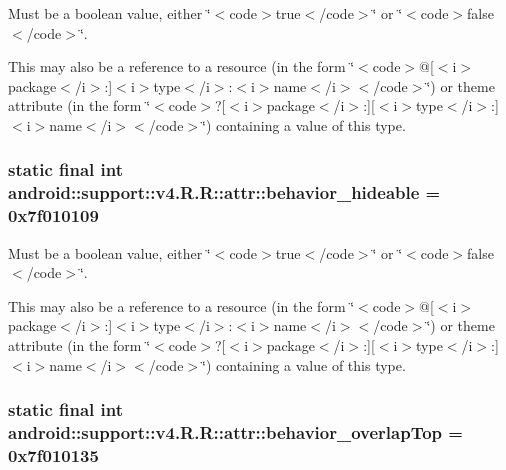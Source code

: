 Must be a boolean value, either \char`\"{}$<$code$>$true$<$/code$>$\char`\"{} or \char`\"{}$<$code$>$false$<$/code$>$\char`\"{}. 

This may also be a reference to a resource (in the form \char`\"{}$<$code$>$@\mbox{[}$<$i$>$package$<$/i$>$:\mbox{]}$<$i$>$type$<$/i$>$:$<$i$>$name$<$/i$>$$<$/code$>$\char`\"{}) or theme attribute (in the form \char`\"{}$<$code$>$?\mbox{[}$<$i$>$package$<$/i$>$:\mbox{]}\mbox{[}$<$i$>$type$<$/i$>$:\mbox{]}$<$i$>$name$<$/i$>$$<$/code$>$\char`\"{}) containing a value of this type. \hypertarget{classandroid_1_1support_1_1v4_1_1_r_1_1attr_a3524b9e50fbda6623397d9348094e21}{
\subsubsection[{behavior\_\-hideable}]{\setlength{\rightskip}{0pt plus 5cm}static final int android::support::v4.R.R::attr::behavior\_\-hideable = 0x7f010109}}
\label{classandroid_1_1support_1_1v4_1_1_r_1_1attr_a3524b9e50fbda6623397d9348094e21}


Must be a boolean value, either \char`\"{}$<$code$>$true$<$/code$>$\char`\"{} or \char`\"{}$<$code$>$false$<$/code$>$\char`\"{}. 

This may also be a reference to a resource (in the form \char`\"{}$<$code$>$@\mbox{[}$<$i$>$package$<$/i$>$:\mbox{]}$<$i$>$type$<$/i$>$:$<$i$>$name$<$/i$>$$<$/code$>$\char`\"{}) or theme attribute (in the form \char`\"{}$<$code$>$?\mbox{[}$<$i$>$package$<$/i$>$:\mbox{]}\mbox{[}$<$i$>$type$<$/i$>$:\mbox{]}$<$i$>$name$<$/i$>$$<$/code$>$\char`\"{}) containing a value of this type. \hypertarget{classandroid_1_1support_1_1v4_1_1_r_1_1attr_82f77fc0b1101f1d4ad4f18f9ae446b1}{
\subsubsection[{behavior\_\-overlapTop}]{\setlength{\rightskip}{0pt plus 5cm}static final int android::support::v4.R.R::attr::behavior\_\-overlapTop = 0x7f010135}}
\label{classandroid_1_1support_1_1v4_1_1_r_1_1attr_82f77fc0b1101f1d4ad4f18f9ae446b1}


